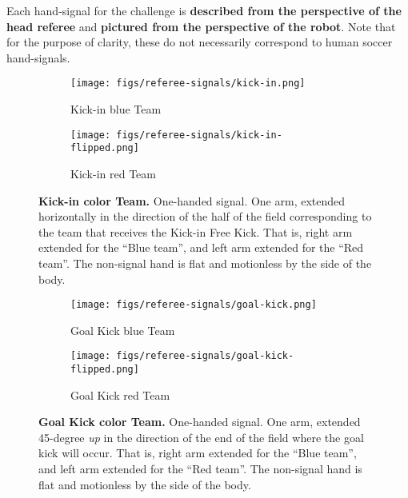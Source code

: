 Each hand-signal for the challenge is \textbf{described from the perspective of the head referee} and \textbf{pictured from the perspective of the robot}. Note that for the purpose of clarity, these do not necessarily correspond to human soccer hand-signals.

\begin{figure*}[ht!]
    \centering
    \begin{subfigure}{.33\textwidth}
        \centering
        \texttt{[image: figs/referee-signals/kick-in.png]}
        \caption{\color{blue}Kick-in \textlangle{}blue\textrangle{} Team}
    \end{subfigure}
    \begin{subfigure}{.33\textwidth}
        \centering
        \texttt{[image: figs/referee-signals/kick-in-flipped.png]}
        \caption{\color{red}Kick-in \textlangle{}red\textrangle{} Team}
    \end{subfigure}
    \caption{\textbf{Kick-in \textlangle{}color\textrangle{} Team.} One-handed signal. One arm, extended horizontally in the direction of the half of the field corresponding to the team that receives the Kick-in Free Kick. That is, right arm extended for the ``Blue team'', and left arm extended for the ``Red team''. The non-signal hand is flat and motionless by the side of the body.}
\end{figure*}
    
\begin{figure}[ht!]
    \centering
    \begin{subfigure}{.33\textwidth}
        \centering
        \texttt{[image: figs/referee-signals/goal-kick.png]}
        \caption{\color{blue}Goal Kick \textlangle{}blue\textrangle{} Team}
    \end{subfigure}
    \begin{subfigure}{.33\textwidth}
        \centering
        \texttt{[image: figs/referee-signals/goal-kick-flipped.png]}
        \caption{\color{red}Goal Kick \textlangle{}red\textrangle{} Team}
    \end{subfigure}
    \caption{\textbf{Goal Kick \textlangle{}color\textrangle{} Team.} One-handed signal. One arm, extended 45-degree \emph{up} in the direction of the end of the field where the goal kick will occur. That is, right arm extended for the ``Blue team'', and left arm extended for the ``Red team''. The non-signal hand is flat and motionless by the side of the body.}
\end{figure}

